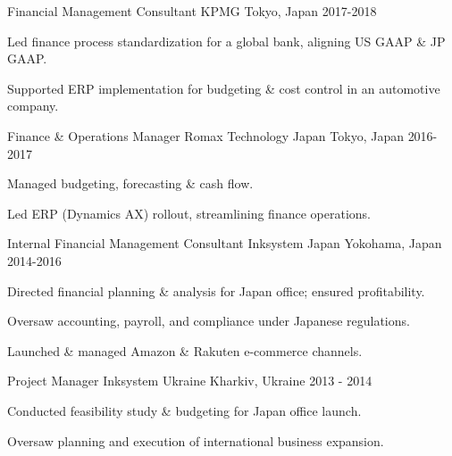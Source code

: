\begin{cventries}

\cventry
{Financial Management Consultant} %
{KPMG} %
{Tokyo, Japan} %
{2017-2018} %
{ %
\begin{cvitems}
\item {Led finance process standardization for a global bank, aligning US GAAP \& JP GAAP.}
\item {Supported ERP implementation for budgeting \& cost control in an automotive company.}
\end{cvitems}
}


\cventry
{Finance \& Operations Manager} %
{Romax Technology Japan} %
{Tokyo, Japan} %
{2016-2017} %
{ %
\begin{cvitems}
\item {Managed budgeting, forecasting \& cash flow.}
\item {Led ERP (Dynamics AX) rollout, streamlining finance operations.}
\end{cvitems}
}


\cventry
{Internal Financial Management Consultant} %
{Inksystem Japan} %
{Yokohama, Japan} %
{2014-2016} %
{ %
\begin{cvitems}
\item {Directed financial planning \& analysis for Japan office; ensured profitability.}
\item {Oversaw accounting, payroll, and compliance under Japanese regulations.}
\item {Launched \& managed Amazon \& Rakuten e-commerce channels.}
\end{cvitems}
}


\cventry
{Project Manager} %
{Inksystem Ukraine} %
{Kharkiv, Ukraine} %
{2013 - 2014} %
{ %
\begin{cvitems}
\item {Conducted feasibility study \& budgeting for Japan office launch.}
\item {Oversaw planning and execution of international business expansion.}
\end{cvitems}
}



\end{cventries}
